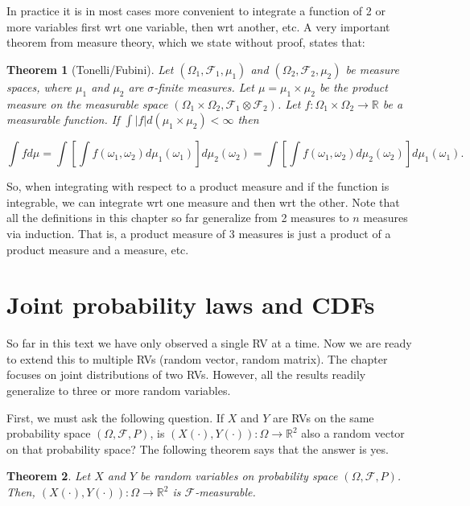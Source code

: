\documentclass{book}
\theoremstyle{plain}%
\newtheorem{theorem}{Theorem}[section]
\theoremstyle{definition}
\newlength{\arrow}
\begin{document}
In practice it is in most cases more convenient to integrate a function of 2 or more variables first wrt one variable, then wrt another, etc. A very important theorem from measure theory, which we state without proof, states that:

\begin{theorem}[Tonelli/Fubini] Let $(\Omega_1, \mathcal{F}_1, \mu_1)$ and $(\Omega_2, \mathcal{F}_2, \mu_2)$ be measure spaces, where $\mu_1$ and $\mu_2$ are $\sigma$-finite measures. Let $\mu = \mu_1 \times \mu_2$  be the product measure on the measurable space $(\Omega_1 \times \Omega_2, \mathcal{F}_1 \otimes \mathcal{F}_2)$. Let $f: \Omega_1 \times \Omega_2 \rightarrow \mathbb{R}$ be a measurable function. If $\int |f| d(\mu_1 \times \mu_2) < \infty$ then

$$\int f d\mu = \int \left[\int f(\omega_1, \omega_2) d\mu_1(\omega_1)\right]d\mu_2(\omega_2) = \int \left[\int f(\omega_1, \omega_2) d\mu_2(\omega_2)\right]d\mu_1(\omega_1).$$
\end{theorem}

So, when integrating with respect to a product measure and if the function is integrable, we can integrate wrt one measure and then wrt the other. Note that all the definitions in this chapter so far generalize from 2 measures to $n$ measures via induction. That is, a product measure of 3 measures is just a product of a product measure and a measure, etc.

\section{Joint probability laws and CDFs}

So far in this text we have only observed a single RV at a time. Now we are ready to extend this to multiple RVs (random vector, random matrix). The chapter focuses on joint distributions of two RVs. However, all the results readily generalize to three or more random variables.

First, we must ask the following question. If $X$ and $Y$ are RVs on the same probability space $(\Omega, \mathcal{F}, P)$, is $(X(\cdot), Y(\cdot)):\Omega \rightarrow \mathbb{R}^2$ also a random vector on that probability space? The following theorem says that the answer is yes.

\begin{theorem}
Let $X$ and $Y$ be random variables on probability space $(\Omega, \mathcal{F}, P)$. Then, $(X(\cdot), Y(\cdot)):\Omega \rightarrow \mathbb{R}^2$ is $\mathcal{F}$-measurable.
\end{theorem}
\end{document}
